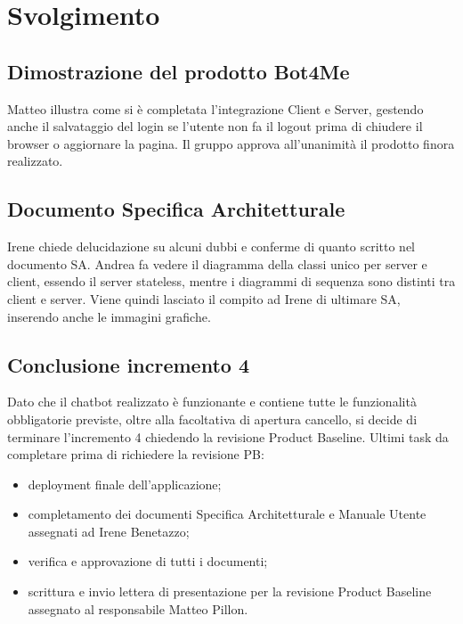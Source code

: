 \section{Svolgimento}
\subsection{Dimostrazione del prodotto Bot4Me}
Matteo illustra come si è completata l'integrazione Client e Server, gestendo anche il salvataggio del login se l'utente non fa il logout prima di chiudere il browser o aggiornare la pagina. \newline
Il gruppo approva all'unanimità il prodotto finora realizzato.
\subsection{Documento Specifica Architetturale}
Irene chiede delucidazione su alcuni dubbi e conferme di quanto scritto nel documento SA. \newline
Andrea fa vedere il diagramma  della classi unico per server e client, essendo il server stateless, mentre i diagrammi di sequenza sono distinti tra client e server.
Viene quindi lasciato il compito ad Irene di ultimare SA, inserendo anche le immagini grafiche.
\subsection{Conclusione incremento 4}
Dato che il chatbot realizzato è funzionante e contiene tutte le funzionalità obbligatorie previste, oltre alla facoltativa di apertura cancello, si decide di terminare l'incremento 4 chiedendo la revisione Product Baseline. \newline
Ultimi task da completare prima di richiedere la revisione PB:
\begin{itemize}
    \item deployment finale dell'applicazione;
    \item completamento dei documenti Specifica Architetturale e Manuale Utente assegnati ad Irene Benetazzo;
    \item verifica e approvazione di tutti i documenti;
    \item scrittura e invio lettera di presentazione per la revisione Product Baseline assegnato al responsabile Matteo Pillon.
\end{itemize} 
